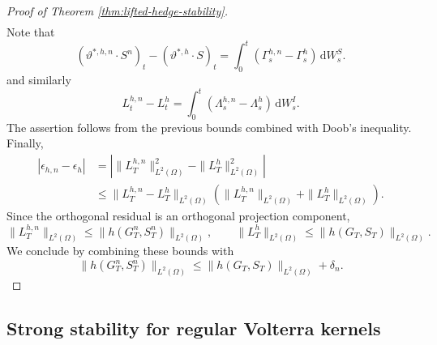 \documentclass[10pt,a4paper,reqno]{amsart}
\theoremstyle{plain}
\theoremstyle{definition}
\theoremstyle{remark}
\theoremstyle{example}
\begin{document}
\begin{proof}[Proof of Theorem \ref{thm:lifted-hedge-stability}]
\begin{align}
\end{align}
Note that  
\[
    (\vartheta^{*,h,n}\cdot S^n)_t - (\vartheta^{*,h}\cdot S)_t = \int_0^t (\Gamma_s^{h,n}- \Gamma_s^h) \,\mathrm dW_s^S.
\]
and similarly
\[
    L_t^{h,n}-L_t^h = \int_0^t (\Lambda_s^{h,n}-\Lambda_s^h)\,\mathrm dW_s^I.
\]
The assertion follows from the previous bounds combined with Doob's inequality. Finally,
\begin{align*}
    |\epsilon_{h,n}-\epsilon_h| &= \left| \|L_T^{h,n}\|_{L^2(\Omega)}^2 - \|L_T^h\|_{L^2(\Omega)}^2 \right|
    \\ &\leq \|L_T^{h,n}-L_T^h\|_{L^2(\Omega)} \left( \|L_T^{h,n}\|_{L^2(\Omega)} + \|L_T^h\|_{L^2(\Omega)} \right).
\end{align*}
Since the orthogonal residual is an orthogonal projection component,
\[
 \|L_T^{h,n}\|_{L^2(\Omega)} \leq \|h(G_T^n,S_T^n)\|_{L^2(\Omega)},
 \qquad
 \|L_T^h\|_{L^2(\Omega)} \leq \|h(G_T,S_T)\|_{L^2(\Omega)}.
\]
We conclude by combining these bounds with
\[
 \|h(G_T^n,S_T^n)\|_{L^2(\Omega)}
 \leq \|h(G_T,S_T)\|_{L^2(\Omega)}+\delta_n.
\]
\end{proof}

\subsection{Strong stability for regular Volterra kernels}\label{sec:strong-stability}
\end{document}
